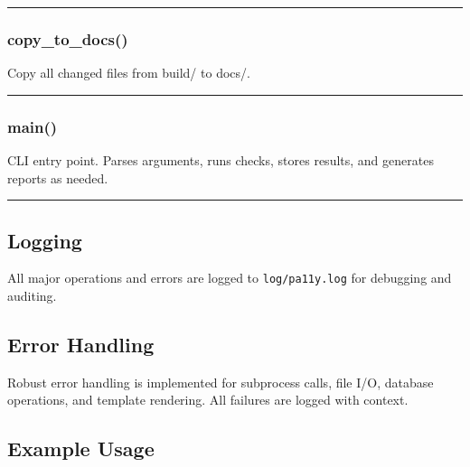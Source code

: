 \begin{center}\rule{0.5\linewidth}{0.5pt}\end{center}

\subsubsection{copy\_to\_docs()}\label{copy_to_docs}

Copy all changed files from build/ to docs/.

\begin{center}\rule{0.5\linewidth}{0.5pt}\end{center}

\subsubsection{main()}\label{main}

CLI entry point. Parses arguments, runs checks, stores results, and
generates reports as needed.

\begin{center}\rule{0.5\linewidth}{0.5pt}\end{center}

\subsection{Logging}\label{logging}

All major operations and errors are logged to \texttt{log/pa11y.log} for
debugging and auditing.

\subsection{Error Handling}\label{error-handling}

Robust error handling is implemented for subprocess calls, file I/O,
database operations, and template rendering. All failures are logged
with context.

\subsection{Example Usage}\label{example-usage}

\begin{Shaded}
\begin{Highlighting}[]
\end{Highlighting}
\end{Shaded}

